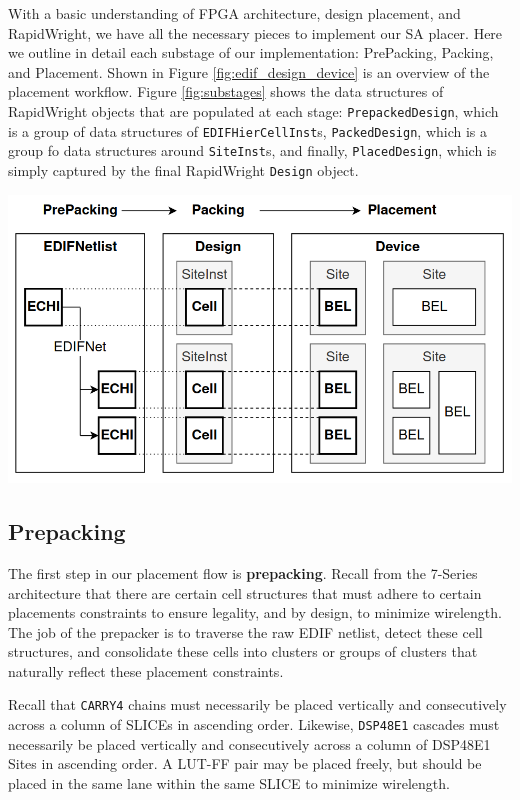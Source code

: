 \begin{multicols}{2}
\label{sec:simulated_annealing}
With a basic understanding of FPGA architecture, design placement, and RapidWright, we have all the necessary pieces to implement our SA placer. 
Here we outline in detail each substage of our implementation: PrePacking, Packing, and Placement. 
Shown in Figure \ref{fig:edif_design_device} is an overview of the placement workflow. 
Figure \ref{fig:substages} shows the data structures of RapidWright objects that are populated at each stage: \texttt{PrepackedDesign}, which is a group of data structures of \texttt{EDIFHierCellInst}s, \texttt{PackedDesign}, which is a group fo data structures around \texttt{SiteInst}s, and finally, \texttt{PlacedDesign}, which is simply captured by the final RapidWright \texttt{Design} object. 

\vspace{0.5cm}
{
    \centering
    \includegraphics[width=0.9\columnwidth]{figures/edif_design_device.png}
    \label{fig:edif_design_device}
}


\subsection{Prepacking}
\label{subsec:prepacking}


The first step in our placement flow is \textbf{prepacking}. 
Recall from the 7-Series architecture that there are certain cell structures that must adhere to certain placements constraints to ensure legality, and by design, to minimize wirelength. 
The job of the prepacker is to traverse the raw EDIF netlist, detect these cell structures, and consolidate these cells into clusters or groups of clusters that naturally reflect these placement constraints. 

Recall that \texttt{CARRY4} chains must necessarily be placed vertically and consecutively across a column of SLICEs in ascending order. 
Likewise, \texttt{DSP48E1} cascades must necessarily be placed vertically and consecutively across a column of DSP48E1 Sites in ascending order. 
A LUT-FF pair may be placed freely, but should be placed in the same lane within the same SLICE to minimize wirelength.


\end{multicols}
